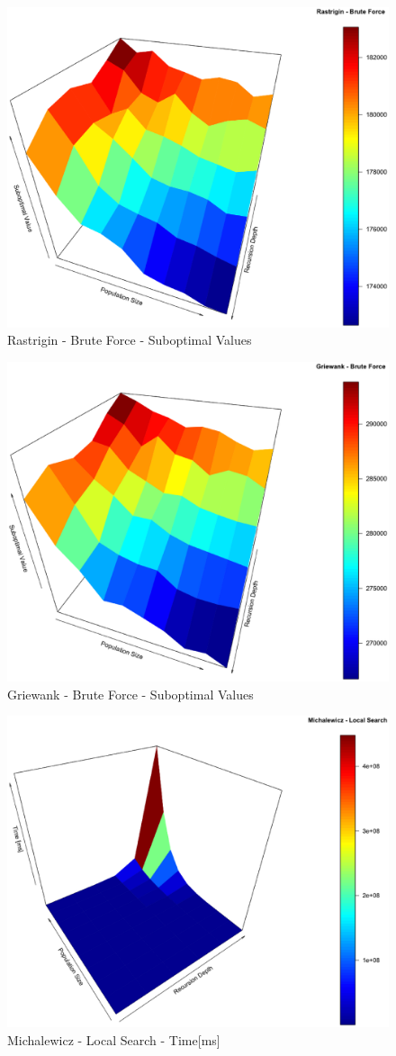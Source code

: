 \documentclass[conference]{IEEEtran}
\begin{document}
\begin{figure}[tbp]
\centering
\includegraphics[width=1.0\hsize,height=0.65\hsize]{fig27.eps}
\caption{Rastrigin - Brute Force - Suboptimal Values}
\label{fig09}
\end{figure}

\begin{figure}[tbp]
\centering
\includegraphics[width=1.0\hsize,height=0.65\hsize]{fig30.eps}
\caption{Griewank - Brute Force - Suboptimal Values}
\label{fig10}
\end{figure}

\begin{figure}[tbp]
\centering
\includegraphics[width=1.0\hsize,height=0.65\hsize]{fig02.eps}
\caption{Michalewicz - Local Search - Time[ms]}
\label{fig11}
\end{figure}
\end{document}
